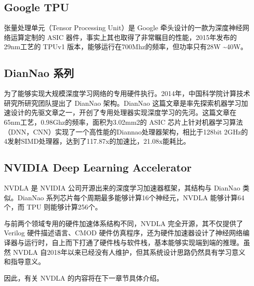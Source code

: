 \subsection{Google TPU}

张量处理单元（Tensor Processing Unit）是 Google 牵头设计的一款为深度神经网络运算定制的 ASIC 器件，事实上其也取得了非常瞩目的性能，2015年发布的29nm工艺的 TPUv1 版本，能够运行在700Mhz的频率，但功率只有28W \textasciitilde 40W。

\subsection{DianNao 系列}

为了能够实现大规模深度学习网络的专用硬件执行。2014年，中国科学院计算技术研究所研究团队提出了 DianNao 架构。DianNao 这篇文章是率先探索机器学习加速设计的先驱文章之一，开创了专用处理器实现深度学习的先河。这篇文章在65nm工艺，0.98Ghz的频率，面积为3.02mm2的 ASIC 芯片上针对机器学习算法（DNN，CNN）实现了一个高性能的Diannao处理器架构，相比于128bit 2GHz的4发射SIMD处理器，达到了117.87x的加速比，21.08x能耗比。

\subsection{NVIDIA Deep Learning Accelerator}

NVDLA 是 NVIDIA 公司开源出来的深度学习加速器框架，其结构与 DianNao 类似。DianNao 系列芯片每个周期最多能够计算16个神经元，NVDLA 能够计算64个，而 TPU 则能够计算256个。

与前两个领域专用的硬件加速体系结构不同，NVDLA 完全开源，其不仅提供了 Verilog 硬件描述语言、CMOD 硬件仿真程序，还为硬件加速器设计了神经网络编译器与运行时，自上而下打通了硬件栈与软件栈，基本能够实现端到端的推理。虽然 NVDLA 自2018年以来已经没有人维护，但其系统设计思路仍然具有学习意义和指导意义。

因此，有关 NVDLA 的内容将在下一章节具体介绍。

